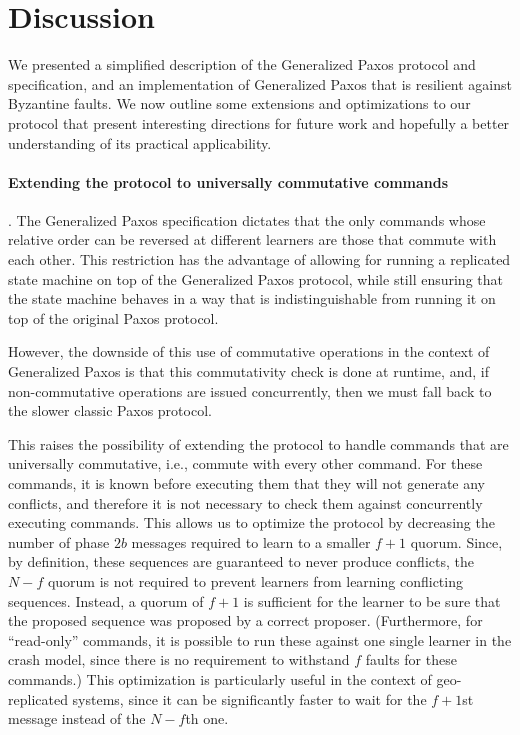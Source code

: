\section{Discussion}
\label{sec:disc}
%
We presented a simplified description of the Generalized Paxos protocol and specification, 
and an implementation of Generalized Paxos that is resilient against Byzantine faults.
We now outline some extensions and optimizations to our protocol that present interesting directions for future work and hopefully
a better understanding of its practical applicability.

\paragraph{Extending the protocol to universally commutative commands}.
The Generalized Paxos specification dictates that the only commands
whose relative order can be reversed at different learners are those
that commute with each other. This restriction has the advantage of
allowing for running a replicated state machine on top of the
Generalized Paxos protocol, while still ensuring that the state
machine behaves in a way that is indistinguishable from running it on
top of the original Paxos protocol.

However, the downside of this use of commutative operations in the
context of Generalized Paxos is that this commutativity check is done
at runtime, and, if non-commutative operations are issued
concurrently, then we must fall back to the slower
classic Paxos protocol.

This raises the possibility of extending the protocol to handle
commands that are universally commutative, i.e., commute with every
other command. For these commands, it is known before executing them
that they will not generate any conflicts, and therefore it is not
necessary to check them against concurrently executing commands.  This
allows us to optimize the protocol by decreasing the number of phase
$2b$ messages required to learn to a smaller $f+1$ quorum. Since, by
definition, these sequences are guaranteed to never produce conflicts,
the $N-f$ quorum is not required to prevent learners from learning
conflicting sequences. Instead, a quorum of $f+1$ is sufficient for
the learner to be sure that the proposed sequence was proposed by a
correct proposer. (Furthermore, for ``read-only'' commands, it is possible to run these
against one single learner in the crash model, since there is no
requirement to withstand $f$ faults for these commands.)
This optimization is particularly useful in the context of 
geo-replicated systems, since it can be significantly faster
to wait for the $f+1$st message instead of the $N-f$th one.

